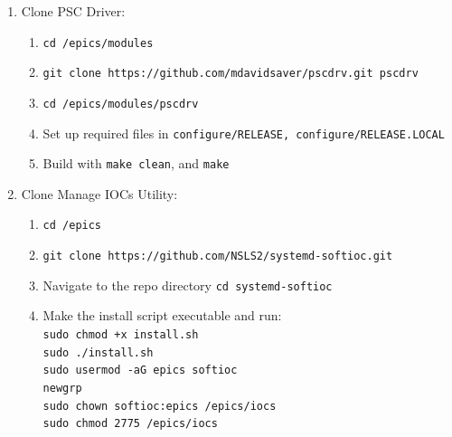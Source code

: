\begin{enumerate}
		\item Clone PSC Driver:
		\begin{enumerate}
			\item \texttt{cd /epics/modules}
			\item \texttt{git clone https://github.com/mdavidsaver/pscdrv.git pscdrv}
			\item \texttt{cd /epics/modules/pscdrv}
			\item Set up required files in \texttt{configure/RELEASE, configure/RELEASE.LOCAL}
			\item Build with \texttt{make clean}, and \texttt{make}
		\end{enumerate}

		\item Clone Manage IOCs Utility:
		\begin{enumerate}
			\item \texttt{cd /epics}
			\item \texttt{git clone https://github.com/NSLS2/systemd-softioc.git}
			\item Navigate to the repo directory \texttt{cd systemd-softioc}
			\item Make the install script executable and run:\\
			\hspace*{2em}\texttt{sudo chmod +x install.sh}\\
			\hspace*{2em}\texttt{sudo ./install.sh}\\
			\hspace*{2em}\texttt{sudo usermod -aG epics softioc}\\
			\hspace*{2em}\texttt{newgrp}\\
			\hspace*{2em}\texttt{sudo chown softioc:epics /epics/iocs}\\
			\hspace*{2em}\texttt{sudo chmod 2775 /epics/iocs}\\
		\end{enumerate}
	\end{enumerate}

